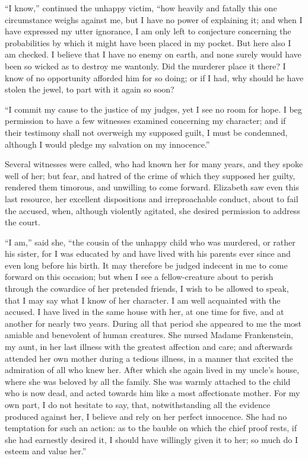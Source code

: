 ``I know,'' continued the unhappy
victim, ``how heavily and fatally this
one circumstance weighs against me,
but I have no power of explaining it;
and when I have expressed my utter
ignorance, I am only left to conjecture
concerning the probabilities by which
it might have been placed in my
pocket. But here also I am checked.
I believe that I have no enemy on earth,
and none surely would have been so
wicked as to destroy me wantonly.
Did the murderer place it there? I
know of no opportunity afforded him
for so doing; or if I had, why should
he have stolen the jewel, to part with it
again so soon?

``I commit my cause to the justice
of my judges, yet I see no room for
hope. I beg permission to have a few
witnesses examined concerning my
character; and if their testimony shall
not overweigh my supposed guilt, I
must be condemned, although I would
pledge my salvation on my innocence.''

Several witnesses were called, who
had known her for many years, and
they spoke well of her; but fear, and
hatred of the crime of which they supposed
her guilty, rendered them timorous,
and unwilling to come forward.
Elizabeth saw even this last resource,
her excellent dispositions and irreproachable
conduct, about to fail the
accused, when, although violently agitated,
she desired permission to address
the court.

``I am,'' said she, ``the cousin of the
unhappy child who was murdered, or
rather his sister, for I was educated by
and have lived with his parents ever
since and even long before his birth. It
may therefore be judged indecent in me
to come forward on this occasion; but
when I see a fellow-creature about to
perish through the cowardice of her
pretended friends, I wish to be allowed
to speak, that I may say what I know of
her character. I am well acquainted
with the accused. I have lived in the
same house with her, at one time for
five, and at another for nearly two years.
During all that period she appeared to
me the most amiable and benevolent of
human creatures. She nursed Madame
Frankenstein, my aunt, in her last illness
with the greatest affection and care; and
afterwards attended her own mother
during a tedious illness, in a manner
that excited the admiration of all who
knew her. After which she again lived
in my uncle's house, where she was
beloved by all the family. She was
warmly attached to the child who is
now dead, and acted towards him like
a most affectionate mother. For my own
part, I do not hesitate to say, that, notwithstanding
all the evidence produced
against her, I believe and rely on her
perfect innocence. She had no temptation
for such an action: as to the bauble
on which the chief proof rests, if she
had earnestly desired it, I should have
willingly given it to her; so much do
I esteem and value her.''

